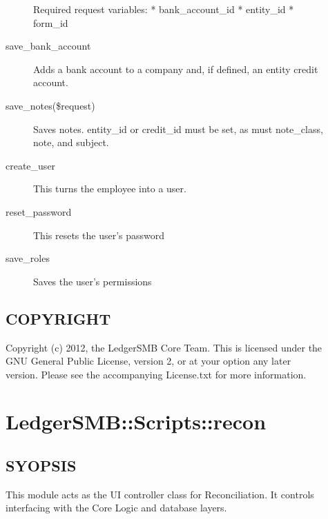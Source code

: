 \begin{description}
\begin{description}
Required request variables:
* bank\_account\_id
* entity\_id
* form\_id


\item[{save\_bank\_account}] \mbox{}

Adds a bank account to a company and, if defined, an entity credit account.


\item[{save\_notes(\$request)}] \mbox{}

Saves notes.  entity\_id or credit\_id must be set, as must note\_class, note, and 
subject.


\item[{create\_user}] \mbox{}

This turns the employee into a user.


\item[{reset\_password}] \mbox{}

This resets the user's password


\item[{save\_roles}] \mbox{}

Saves the user's permissions

\end{description}
\subsection*{COPYRIGHT\label{LedgerSMB::Scripts::contact_COPYRIGHT}}


Copyright (c) 2012, the LedgerSMB Core Team.  This is licensed under the GNU 
General Public License, version 2, or at your option any later version.  Please 
see the accompanying License.txt for more information.

\section{LedgerSMB::Scripts::recon\label{LedgerSMB::Scripts::recon}}




\subsection*{SYOPSIS\label{LedgerSMB::Scripts::recon_SYOPSIS}}


This module acts as the UI controller class for Reconciliation. It controls
interfacing with the Core Logic and database layers.


\end{description}
